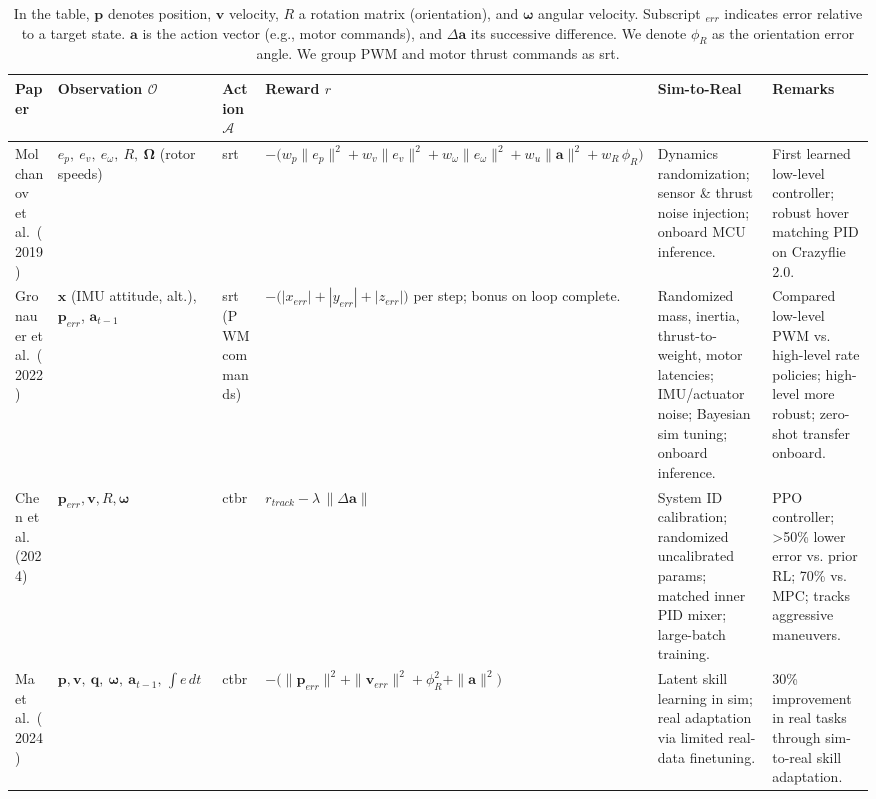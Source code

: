 \begin{table*}[!b] 
\centering
  \caption{In the table, $\mathbf{p}$ denotes position, $\mathbf{v}$ velocity, $R$ a rotation matrix (orientation), and $\boldsymbol{\omega}$ angular velocity. Subscript $_{err}$ indicates error relative to a target state. $\mathbf{a}$ is the action vector (e.g., motor commands), and $\Delta \mathbf{a}$ its successive difference. We denote $\phi_R$ as the orientation error angle. We group PWM and motor thrust commands as \gls{srt}.}
  \label{tab:rl_comparison}
\scriptsize
\begin{tabular}{p{2.0cm}<{\raggedright} p{2.5cm}<{\raggedright} p{2.0cm}<{\raggedright} p{3.0cm}<{\raggedright} p{2.8cm}<{\raggedright} p{2.7cm}<{\raggedright}}
\hline
\textbf{Paper} & \textbf{Observation $\mathcal{O}$} & \textbf{Action $\mathcal{A}$} & \textbf{Reward $r$} & \textbf{Sim-to-Real} & \textbf{Remarks} \\
\hline
Molchanov et al.\ (2019) \cite{molchanov_sim--multi-real_2019} & $e_p,\ e_v,\ e_\omega,\ R,\ \boldsymbol{\Omega}$ (rotor speeds) & \gls{srt} & { $-\bigl(w_p\|e_p\|^2 + w_v\|e_v\|^2 + w_\omega\|e_\omega\|^2 + w_u\|\mathbf{a}\|^2 + w_R\,\phi_R\bigr)$} & { Dynamics randomization; sensor \& thrust noise injection; onboard MCU inference.} & { First learned low-level controller; robust hover matching PID on Crazyflie 2.0.} \\[1ex]

Gronauer et al.\ (2022) \cite{gronauer_using_2022} & $\mathbf{x}$ (IMU attitude, alt.), $\mathbf{p}_{err}$, $\mathbf{a}_{t-1}$ & \gls{srt} (PWM commands) & { $-\bigl(|x_{err}|+|y_{err}|+|z_{err}|\bigr)$ per step; bonus on loop complete.} & { Randomized mass, inertia, thrust-to-weight, motor latencies; IMU/actuator noise; Bayesian sim tuning; onboard inference.} & { Compared low-level PWM vs. high-level rate policies; high-level more robust; zero-shot transfer onboard.} \\[1ex]

Chen et al. (2024) \cite{chen_what_2024} & $\mathbf{p}_{err}, \mathbf{v}, R, \boldsymbol{\omega}$ & \gls{ctbr} & { $r_{track} - \lambda\,\|\Delta\mathbf{a}\|$} & { System ID calibration; randomized uncalibrated params; matched inner PID mixer; large-batch training.} & { PPO controller; >50\% lower error vs. prior RL; 70\% vs. MPC; tracks aggressive maneuvers.} \\[1ex]

Ma et al.\ (2024) \cite{ma2024skilltransfer} & $\mathbf{p},\mathbf{v},\ \mathbf{q},\ \boldsymbol{\omega},\ \mathbf{a}_{t-1},\,\int e\,dt$ & \gls{ctbr}& { $-\bigl(\|\mathbf{p}_{err}\|^2+\|\mathbf{v}_{err}\|^2+\phi_R^2+\|\mathbf{a}\|^2\bigr)$} & { Latent skill learning in sim; real adaptation via limited real-data finetuning.} & { 30\% improvement in real tasks through sim-to-real skill adaptation.} \\[1ex]


\end{tabular}
\end{table*}
